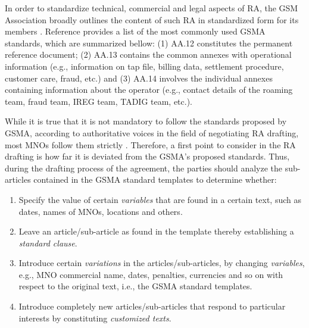 \documentclass[conference]{style/IEEEtran}
\begin{document}
In order to standardize technical, commercial and legal aspects of RA, the GSM Association broadly outlines the content of such RA in standardized form for its members \cite{Ferwerda2018}. Reference \cite{ROCCO2017} provides a list of the most commonly used GSMA standards, which are summarized bellow: (1) AA.12 constitutes the permanent reference document; (2) AA.13 contains the common annexes with operational information (e.g., information on tap file, billing data, settlement procedure, customer care, fraud, etc.) and (3) AA.14 involves the individual annexes containing information about the operator (e.g., contact details of the roaming team, fraud team, IREG team, TADIG team, etc.).

While it is true that it is not mandatory to follow the standards proposed by GSMA, according to authoritative voices in the field of negotiating RA drafting, most MNOs follow them strictly \cite{ROCCO2017a}. Therefore, a first point to consider in the RA drafting is how far it is deviated from the GSMA's proposed standards. Thus, during the drafting process of the agreement, the parties should analyze the sub-articles contained in the GSMA standard templates to determine whether:

\begin{enumerate}
\item Specify the value of certain \textit{variables} that are found in a certain text, such as dates, names of MNOs, locations and others.

\item Leave an article/sub-article as found in the template thereby establishing a \textit{standard clause}.

\item Introduce certain \textit{variations} in the articles/sub-articles, by changing \textit{variables}, e.g., MNO commercial name, dates, penalties, currencies and so on with respect to the original text, i.e., the GSMA standard templates.

\item Introduce completely new articles/sub-articles that respond to particular interests by constituting \textit{customized texts}.

\end{enumerate}
\end{document}
